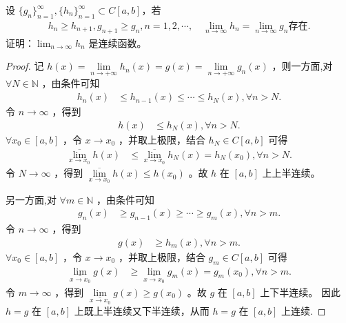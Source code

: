 \documentclass[../../main.tex]{subfiles}
\begin{document}
\begin{example}
设 $\{g_n\}_{n=1}^{\infty}, \{h_n\}_{n=1}^{\infty} \subset C[a,b]$，若
\begin{align*}
h_n \geq h_{n+1}, g_{n+1} \geq g_n, n = 1, 2, \cdots, \quad
\lim_{n \to \infty} h_n = \lim_{n \to \infty} g_n \text{存在}.
\end{align*}
证明：$\lim_{n \to \infty} h_n$ 是连续函数。
\end{example}
\begin{proof}
记 $h\left( x \right) =\underset{n\rightarrow +\infty}{\lim}h_n\left( x \right) =g\left( x \right) =\underset{n\rightarrow +\infty}{\lim}g_n\left( x \right)$ ，则一方面,对 $\forall N\in \mathbb{N}$ ，由条件可知
\begin{align*}
h_n\left( x \right) &\leqslant h_{n-1}\left( x \right) \leqslant \cdots \leqslant h_N\left( x \right) ,\forall n>N.
\end{align*}
令 $n\rightarrow \infty$ ，得到
\begin{align*}
h\left( x \right) &\leqslant h_N\left( x \right) ,\forall n>N.
\end{align*}
$\forall x_0\in \left[ a,b \right]$ ，令 $x\rightarrow x_0$ ，并取上极限，结合 $h_N\in C\left[ a,b \right]$ 可得
\begin{align*}
\underset{x\rightarrow x_0}{\overline{\lim }}h\left( x \right) &\leqslant \underset{x\rightarrow x_0}{\overline{\lim }}h_N\left( x \right) =h_N\left( x_0 \right) ,\forall n>N.
\end{align*}
令 $N\rightarrow \infty$ ，得到 $\underset{x\rightarrow x_0}{\overline{\lim }}h\left( x \right) \leqslant h\left( x_0 \right)$ 。故 $h$ 在 $\left[ a,b \right]$ 上上半连续。

另一方面,对 $\forall m\in \mathbb{N}$ ，由条件可知
\begin{align*}
g_n\left( x \right) &\geqslant g_{n-1}\left( x \right) \geqslant \cdots \geqslant g_m\left( x \right) ,\forall n>m.
\end{align*}
令 $n\rightarrow \infty$ ，得到
\begin{align*}
g\left( x \right) &\geqslant h_m\left( x \right) ,\forall n>m.
\end{align*}
$\forall x_0\in \left[ a,b \right]$ ，令 $x\rightarrow x_0$ ，并取上极限，结合 $g_m\in C\left[ a,b \right]$ 可得
\begin{align*}
\underset{x\rightarrow x_0}{\underline{\lim }}g\left( x \right) &\geqslant \underset{x\rightarrow x_0}{\underline{\lim }}g_m\left( x \right) =g_m\left( x_0 \right) ,\forall n>m.
\end{align*}
令 $m\rightarrow \infty$ ，得到 $\underset{x\rightarrow x_0}{\underline{\lim }}g\left( x \right) \geqslant g\left( x_0 \right)$ 。故 $g$ 在 $\left[ a,b \right]$ 上下半连续。
因此 $h=g$ 在 $\left[ a,b \right]$ 上既上半连续又下半连续，从而 $h=g$ 在 $\left[ a,b \right]$ 上连续.
\end{proof}
\end{document}
